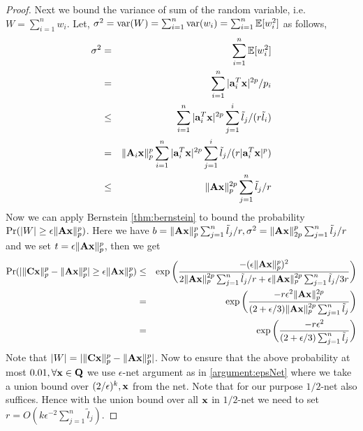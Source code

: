 \begin{proof}{\label{proof:slowOnlineGuarantee}}
Next we bound the variance of sum of the random variable, i.e. $W = \sum_{i=1}^{n} w_{i}$. Let, $\sigma^{2} = \mbox{var}(W) = \sum_{i=1}^{n} \mbox{var}(w_{i}) = \sum_{i=1}^{n}\~E[w_{i}^{2}]$ as follows,
% 
\begin{eqnarray*}
 \sigma^{2} &=& \sum_{i=1}^{n} \~E[w_{i}^{2}] \\
 &=& \sum_{i=1}^{n} |\*a_{i}^{T}\*x|^{2p}/p_{i} \\ 
 &\leq& \sum_{i=1}^{n} |\*a_{i}^{T}\*x|^{2p}\sum_{j=1}^{i}\tilde{l}_{j}/(r\tilde{l}_{i}) \\
 &=& \|\*A_{i}\*x\|_{p}^{p}\sum_{i=1}^{n} |\*a_{i}^{T}\*x|^{2p}\sum_{j=1}^{i}\tilde{l}_{j}/(r|\*a_{i}^{T}\*x|^{p}) \\
 &\leq& \|\*A\*x\|_{p}^{2p}\sum_{j=1}^{n}\tilde{l}_{j}/r 
\end{eqnarray*}
% 
 Now we can apply Bernstein \ref{thm:bernstein} to bound the probability $\mbox{Pr}(|W| \geq \epsilon\|\*A\*x\|_{p}^{p})$. Here we have $b = \|\*A\*x\|_{p}^{p}\sum_{j=1}^{n}\tilde{l}_{j}/r, \sigma^{2} = \|\*A\*x\|_{2p}^{p}\sum_{j=1}^{n}\tilde{l}_{j}/r$ and we set $t = \epsilon\|\*A\*x\|_{p}^{p}$, then we get
\begin{eqnarray*}
 \mbox{Pr}(|\|\*C\*x\|_{p}^{p} - \|\*A\*x\|_{p}^{p}| \geq \epsilon\|\*A\*x\|_{p}^{p}) &\leq& \exp\bigg(\frac{-(\epsilon\|\*A\*x\|_{p}^{p})^{2}}{2\|\*A\*x\|_{p}^{2p}\sum_{j=1}^{n}\tilde{l}_{j}/r+\epsilon\|\*A\*x\|_{p}^{2p}\sum_{j=1}^{n}\tilde{l}_{j}/3r}\bigg) \\
 &=& \exp\bigg(\frac{-r\epsilon^{2}\|\*A\*x\|_{p}^{2p}}{(2+\epsilon/3)\|\*A\*x\|_{p}^{2p}\sum_{j=1}^{n}\tilde{l}_{j}}\bigg) \\
 &=& \exp\bigg(\frac{-r\epsilon^{2}}{(2+\epsilon/3)\sum_{j=1}^{n}\tilde{l}_{j}}\bigg)
\end{eqnarray*}
Note that $|W| = |\|\*C\*x\|_{p}^{p} - \|\*A\*x\|_{p}^{p}|$. Now to ensure that the above probability at most $0.01, \forall \*x \in \*Q$ we use $\epsilon$-net argument as in \ref{argument:epsNet} where we take a union bound over $(2/\epsilon)^{k}, \*x$ from the net. Note that for our purpose $1/2$-net also suffices. Hence with the union bound over all $\*x$ in $1/2$-net we need to set $r = O(k\epsilon^{-2}\sum_{j=1}^{n}\tilde{l}_{j})$. 


\end{proof}
